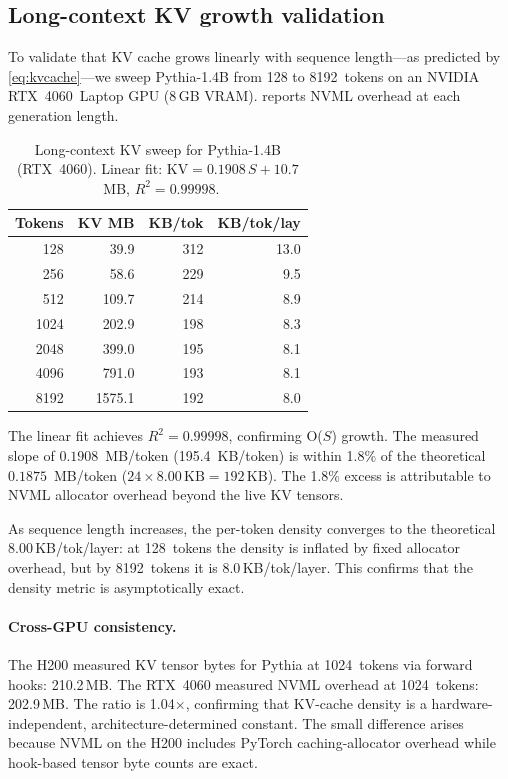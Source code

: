 \documentclass[11pt,a4paper]{article}
\begin{document}
\subsection{Long-context KV growth validation}
\label{sec:results:longctx}

To validate that KV cache grows linearly with sequence length---as
predicted by \cref{eq:kvcache}---we sweep Pythia-1.4B from 128
to 8192~tokens on an NVIDIA RTX~4060~Laptop GPU (8\,GB VRAM).
 reports NVML overhead at each generation length.

\begin{table}[t]
  \centering
  \small
  \caption{Long-context KV sweep for Pythia-1.4B (RTX~4060).
    Linear fit: $\mathrm{KV} = 0.1908\,S + 10.7$~MB,
    $R^2 = 0.99998$.}
  \label{tab:longctx}
  \begin{tabular}{@{}rrrr@{}}
    \toprule
    \textbf{Tokens} & \textbf{KV MB} & \textbf{KB/tok} & \textbf{KB/tok/lay} \\
    \midrule
    128   &   39.9 & 312 & 13.0 \\
    256   &   58.6 & 229 & 9.5 \\
    512   &  109.7 & 214 & 8.9 \\
    1024  &  202.9 & 198 & 8.3 \\
    2048  &  399.0 & 195 & 8.1 \\
    4096  &  791.0 & 193 & 8.1 \\
    8192  & 1575.1 & 192 & 8.0 \\
    \bottomrule
  \end{tabular}
\end{table}

The linear fit achieves $R^2 = 0.99998$, confirming O($S$) growth.
The measured slope of $0.1908$~MB/token (195.4~KB/token) is within
1.8\% of the theoretical $0.1875$~MB/token
($24 \times 8.00\,\text{KB} = 192\,\text{KB}$).
The 1.8\% excess is attributable to NVML allocator overhead beyond
the live KV tensors.

As sequence length increases, the per-token density converges to
the theoretical 8.00\,KB/tok/layer: at 128~tokens the density is
inflated by fixed allocator overhead, but by 8192~tokens it is
8.0\,KB/tok/layer.
This confirms that the density metric is asymptotically exact.

\paragraph{Cross-GPU consistency.}
The H200 measured KV tensor bytes for Pythia at 1024~tokens via
forward hooks: 210.2\,MB.
The RTX~4060 measured NVML overhead at 1024~tokens: 202.9\,MB.
The ratio is 1.04$\times$, confirming that KV-cache density is a
hardware-independent, architecture-determined constant.
The small difference arises because NVML on the H200 includes
PyTorch caching-allocator overhead while hook-based tensor byte
counts are exact.
\end{document}
